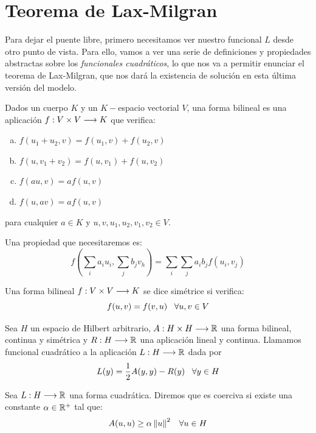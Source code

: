 \chapter{Teorema de Lax-Milgran}

Para dejar el puente libre, primero necesitamos ver nuestro funcional $L$ desde otro punto de vista. Para ello, vamos a ver una serie de definiciones y propiedades abstractas sobre los \textit{funcionales cuadráticos}, lo que nos va a permitir enunciar el teorema de Lax-Milgran, que nos dará la existencia de solución en esta última versión del modelo.

\begin{definition}\label{formabilineal}
Dados un cuerpo $K$ y un $K-$espacio vectorial $V$, una forma bilineal es una aplicación $f : V\times V \longrightarrow K$ que verifica:
\begin{enumerate}[(a)]
\item $f(u_1+u_2,v)=f(u_1,v)+f(u_2,v)$
\item $f(u, v_1+v_2)=f(u,v_1)+f(u,v_2)$
\item $f(au,v)=af(u,v)$
\item $f(u,av)=af(u,v)$
\end{enumerate}
para cualquier $a\in K$ y $u,v,u_1,u_2,v_1,v_2\in V$.

Una propiedad que necesitaremos es:
\[
f\left(\sum_ia_iu_i,\sum_jb_jv_h\right)=\sum_i\sum_ja_ib_jf(u_i,v_j)
\]

\end{definition}

\begin{definition}
Una forma bilineal $f : V\times V \longrightarrow K$ se dice simétrice si verifica:
\[
f(u,v)=f(v,u) \;\;\; \forall u,v\in V
\]
\end{definition}

\begin{definition}
Sea $H$ un espacio de Hilbert arbitrario, $A : H\times H \longrightarrow \mathbb{R}$ una forma bilineal, continua y simétrica y $R : H \longrightarrow \mathbb{R}$ una aplicación lineal y continua. Llamamos funcional cuadrático a la aplicación $L : H \longrightarrow \mathbb{R}$ dada por
\[
L(y)=\frac{1}{2}A(y,y)-R(y) \;\;\;\forall y\in H
\]
\end{definition}

\begin{definition}
Sea $L : H \longrightarrow \mathbb{R}$ una forma cuadrática. Diremos que es coerciva si existe una constante $\alpha\in\mathbb{R}^+$ tal que:
\[
A(u,u)\geq \alpha\left\lVert u\right\rVert^2 \;\;\; \forall u\in H
\]
\end{definition}

